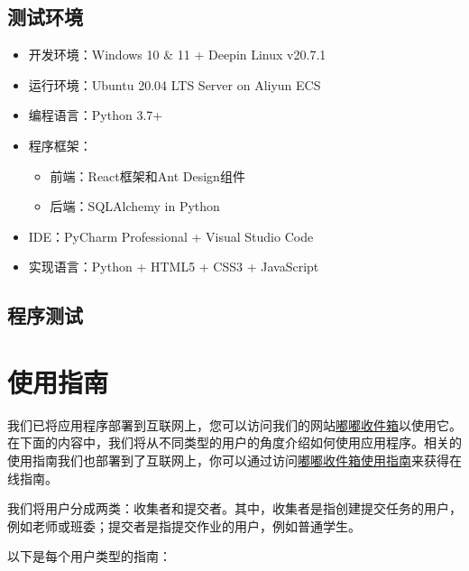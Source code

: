 \documentclass[lang=cn,11pt,a4paper]{elegantpaper}
\begin{document}
\subsection{测试环境}
\begin{itemize}
	\item 开发环境：Windows 10 \& 11 + Deepin Linux v20.7.1
	\item 运行环境：Ubuntu 20.04 LTS Server on Aliyun ECS
	\item 编程语言：Python 3.7+
	\item 程序框架：
		\begin{itemize}
			\item 前端：React框架和Ant Design组件
			\item 后端：SQLAlchemy in Python
		\end{itemize}
	\item IDE：PyCharm Professional + Visual Studio Code
	\item 实现语言：Python + HTML5 + CSS3 + JavaScript
\end{itemize}

\subsection{程序测试}
\clearpage
\section{使用指南}

我们已将应用程序部署到互联网上，您可以访问我们的网站{\href{http://writebug.pythonanywhere.com/}{嘟嘟收件箱}}以使用它。在下面的内容中，我们将从不同类型的用户的角度介绍如何使用应用程序。相关的使用指南我们也部署到了互联网上，你可以通过访问{\href{https://slapaf.github.io/HUST-SE-2022/}{嘟嘟收件箱使用指南}}来获得在线指南。

我们将用户分成两类：收集者和提交者。其中，收集者是指创建提交任务的用户，例如老师或班委；提交者是指提交作业的用户，例如普通学生。

以下是每个用户类型的指南：
\end{document}
